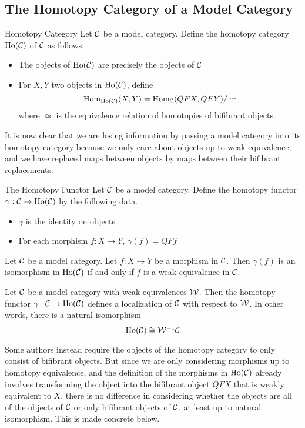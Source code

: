 \documentclass[a4paper]{article}
\begin{document}
\subsection{The Homotopy Category of a Model Category}
\begin{defn}{Homotopy Category}{} Let $\mathcal{C}$ be a model category. Define the homotopy category $\text{Ho}(\mathcal{C})$ of $\mathcal{C}$ as follows. 
\begin{itemize}
\item The objects of $\text{Ho}(\mathcal{C})$ are precisely the objects of $\mathcal{C}$
\item For $X,Y$ two objects in $\text{Ho}(\mathcal{C})$, define $$\operatorname{Hom}_{\text{Ho}(\mathcal{C})}(X,Y)=\operatorname{Hom}_{\mathcal{C}}(QFX,QFY)/\simeq$$ where $\simeq$ is the equivalence relation of homotopies of bifibrant objects. 
\end{itemize}
\end{defn}

It is now clear that we are losing information by passing a model category into its homotopy category because we only care about objects up to weak equivalence, and we have replaced maps between objects by maps between their bifibrant replacements. 

\begin{defn}{The Homotopy Functor}{} Let $\mathcal{C}$ be a model category. Define the homotopy functor $\gamma:\mathcal{C}\to\text{Ho}(\mathcal{C})$ by the following data. 
\begin{itemize}
\item $\gamma$ is the identity on objects
\item For each morphism $f:X\to Y$, $\gamma(f)=QFf$
\end{itemize}
\end{defn}

\begin{lmm}{}{} Let $\mathcal{C}$ be a model category. Let $f:X\to Y$ be a morphism in $\mathcal{C}$. Then $\gamma(f)$ is an isomorphism in $\text{Ho}(\mathcal{C})$ if and only if $f$ is a weak equivalence in $\mathcal{C}$. 
\end{lmm}

\begin{thm}{}{} Let $\mathcal{C}$ be a model category with weak equivalences $\mathcal{W}$. Then the homotopy functor $\gamma:\mathcal{C}\to\text{Ho}(\mathcal{C})$ defines a localization of $\mathcal{C}$ with respect to $\mathcal{W}$. In other words, there is a natural isomorphism $$\text{Ho}(\mathcal{C})\cong\mathcal{W}^{-1}\mathcal{C}$$
\end{thm}

Some authors instead require the objects of the homotopy category to only consist of bifibrant objects. But since we are only considering morphisms up to homotopy equivalence, and the definition of the morphisms in $\text{Ho}(\mathcal{C})$ already involves transforming the object into the bifibrant object $QFX$ that is weakly equivalent to $X$, there is no difference in considering whether the objects are all of the objects of $\mathcal{C}$ or only bifibrant objects of $\mathcal{C}$, at least up to natural isomorphism. This is made concrete below. 
\end{document}
